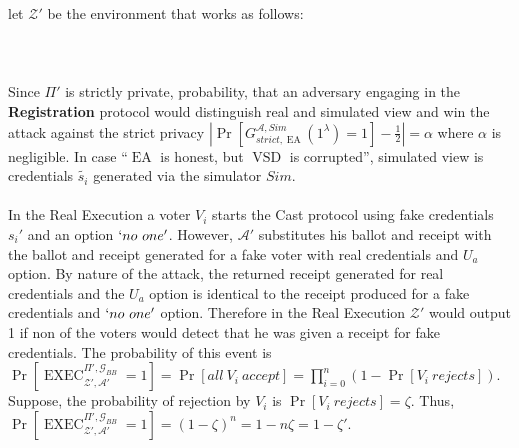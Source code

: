 \documentclass[12pt]{article}
\DeclareMathOperator{\exec}{EXEC}
\DeclareMathOperator{\vsd}{VSD}
\DeclareMathOperator{\ea}{EA}
\begin{document}
let $\mathcal{Z'}$ be the environment that works as follows:\\\\
\\\\
Since $\Pi'$ is strictly private, probability, that an adversary engaging in the \textbf{Registration} protocol would distinguish real and simulated view and win the attack against the strict privacy $|\Pr[G_{strict,\ea}^{\mathcal{A},Sim}(1^{\lambda}) = 1] - \frac{1}{2}| = \alpha$ where $\alpha$ is negligible. In case ``$\ea$ is honest, but $\vsd$ is corrupted'', simulated view is credentials $\tilde{s_i}$ generated via the simulator $Sim$. \\\\
In the Real Execution a voter $V_i$ starts the Cast protocol using fake credentials $s_i'$ and an option $`no~one'$. However, $\mathcal{A'}$ substitutes his ballot and receipt with the ballot and receipt generated for a fake voter with real credentials and $U_a$ option. By nature of the attack, the returned receipt generated for real credentials and the $U_a$ option is identical to the receipt produced for a fake credentials and $`no~one'$ option. Therefore in the Real Execution $\mathcal{Z'}$ would output 1 if non of the voters would detect that he was given a receipt for fake credentials. The probability of this event is $\Pr[\exec_{\mathcal{Z'},\mathcal{A'}}^{\Pi', \mathcal{G}_{BB}} = 1] =  \Pr[all~V_i~accept] = \prod_{i=0}^n(1- \Pr[V_i~rejects] )$. Suppose, the probability of rejection by $V_i$ is $ \Pr[V_i~rejects] = \zeta$. Thus,   $\Pr[\exec_{\mathcal{Z'},\mathcal{A'}}^{\Pi', \mathcal{G}_{BB}} = 1] = (1 - \zeta)^n = 1 - n\zeta = 1- \zeta'$.\\\\
\end{document}
